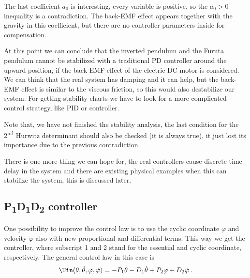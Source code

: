 The last coefficient $a_0$ is interesting, every variable is positive, so the $a_0>0$ inequality is a contradiction. The back-EMF effect appears together with the gravity in this coefficient, but there are no controller parameters inside for compensation.

At this point we can conclude that the inverted pendulum and the Furuta pendulum cannot be stabilized with a traditional PD controller around the upward position, if the  back-EMF effect of the electric DC motor is considered.
We can think that the real system has damping and it can help, but the back-EMF effect is similar to the viscous friction, so this would also destabilize our system. For getting stability charts we have to look for a more complicated control strategy, like PID or \PPDD{} controller.

Note that, we have not finished the stability analysis, the last condition for the 2\textsuperscript{nd} Hurwitz determinant should also be checked (it is always true), it just lost its importance due to the previous contradiction.

There is one more thing we can hope for, the real controllers cause discrete time delay in the system and there are existing physical examples when this can stabilize the system, this is discussed later.





\subsection{\texorpdfstring{P\textsubscript{1}D\textsubscript{1}D\textsubscript{2} controller}{P\_1D\_1D\_2 controller}}

One possibility to improve the control law is to use the cyclic coordinate $\varphi$ and velocity $\dot{\varphi}$ also with new proportional and differential terms. This way we get the \PPDD{} controller, where subscript 1 and 2 stand for the essential and cyclic coordinate, respectively. The general control law in this case is
\begin{align}
	\Uin(\theta, \dot\theta, \varphi, \dot{\varphi}) = -P_1\theta -D_1\dot\theta + P_2\varphi +D_2\dot\varphi\,. \label{eq:PPDD_controller}
\end{align}

